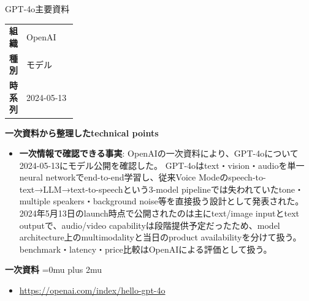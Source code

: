 \begin{technicalnote}{GPT-4o}{主要資料}
\begingroup
\begin{tabularx}{\linewidth}{@{}>{\bfseries}p{0.22\linewidth}X@{}}
組織 & OpenAI \\
種別 & モデル \\
時系列 & 2024-05-13 \\
\end{tabularx}
\smallskip
\begin{minipage}{\linewidth}
{\bfseries 一次資料から整理したtechnical points}
\begin{itemize}[leftmargin=1.5em,itemsep=0.35em]
\item \textbf{一次情報で確認できる事実}: OpenAIの一次資料により、GPT-4oについて2024-05-13にモデル公開を確認した。 GPT-4oはtext・vision・audioを単一neural networkでend-to-end学習し、従来Voice Modeのspeech-to-text→LLM→text-to-speechという3-model pipelineでは失われていたtone・multiple speakers・background noise等を直接扱う設計として発表された。2024年5月13日のlaunch時点で公開されたのは主にtext/image inputとtext outputで、audio/video capabilityは段階提供予定だったため、model architecture上のmultimodalityと当日のproduct availabilityを分けて扱う。benchmark・latency・price比較はOpenAIによる評価として扱う。
\end{itemize}
\begin{minipage}{\linewidth}
\begin{samepage}
{\bfseries 一次資料}
\begingroup\sloppy
\Urlmuskip=0mu plus 2mu\relax
\begin{itemize}[leftmargin=1.5em,itemsep=0.25em]
\item {\scriptsize\url{https://openai.com/index/hello-gpt-4o}}
\end{itemize}
\endgroup
\end{samepage}
\end{minipage}
\end{minipage}
\endgroup
\end{technicalnote}
\medskip

